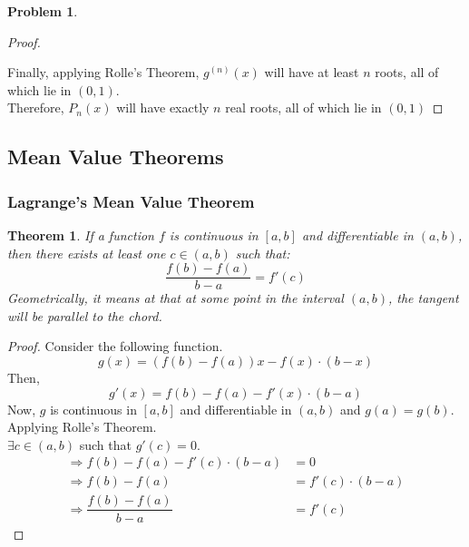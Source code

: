 \documentclass[14]{article}
\newtheorem{theorem}{Theorem}
\theoremstyle{definition}
\newtheorem{prob}{Problem}
\theoremstyle{case}
\begin{document}
\begin{prob}
\begin{proof}
\begin{figure}[h]
\end{figure}
Finally, applying Rolle's Theorem, $g^{(n)}(x)$ will have at least $n$ roots, all of which lie in $(0, 1)$.\\
Therefore, $P_n(x)$ will have exactly $n$ real roots, all of which lie in $(0, 1)$
\end{proof}
\end{prob}
\pagebreak
\subsection{Mean Value Theorems}
\subsubsection{Lagrange's Mean Value Theorem}
\begin{theorem}
If a function $f$ is continuous in $[a, b]$ and differentiable in $(a, b)$, then there exists at least one $c \in (a, b)$ such that:
\[\dfrac{f(b) - f(a)}{b - a} = f'(c)\]
Geometrically, it means at that at some point in the interval $(a, b)$, the tangent will be parallel to the chord.
\end{theorem}
\begin{proof}
Consider the following function.
\[g(x) = \left( f(b) - f(a) \right)x - f(x)\cdot (b - x)\]
Then,
\[g'(x) = f(b) - f(a) - f'(x) \cdot (b - a)\]
Now, $g$ is continuous in $[a, b]$ and differentiable in $(a, b)$ and $g(a) = g(b)$. Applying Rolle's Theorem.\\
$\exists c \in (a, b)$ such that $g'(c) = 0$.\\
\begin{align*}
\Rightarrow f(b) - f(a) - f'(c) \cdot (b - a) &= 0\\
\Rightarrow f(b) - f(a) &= f'(c) \cdot (b - a)\\
\Rightarrow \dfrac{f(b) - f(a)}{b - a} &= f'(c)
\end{align*}
\end{proof}
\end{document}
